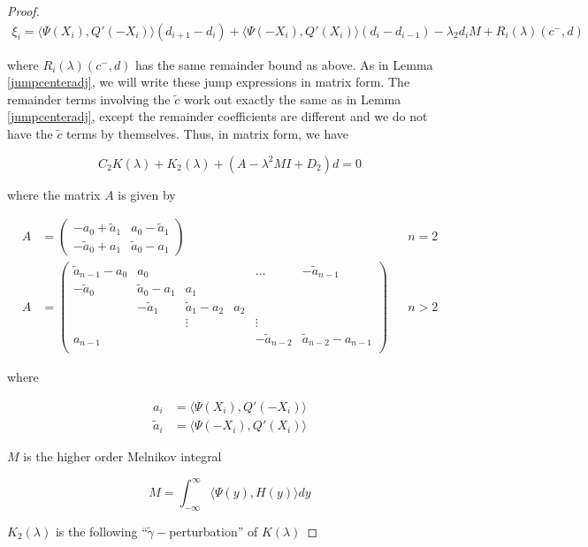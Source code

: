 \documentclass[thesis.tex]{subfiles}
\begin{document}
\begin{lemma}
\begin{proof}
\begin{align*}
\xi_i = \langle \Psi(X_i), Q'(-X_i) \rangle (d_{i+1} - d_i)
+ \langle \Psi(-X_i), Q'(X_i) \rangle (d_i - d_{i-1})
- \lambda_2 d_i M + R_i(\lambda)(c^-, d)
\end{align*}

where $R_i(\lambda)(c^-, d)$ has the same remainder bound as above. As in Lemma \ref{jumpcenteradj}, we will write these jump expressions in matrix form. The remainder terms involving the $\tilde{c}$ work out exactly the same as in Lemma \ref{jumpcenteradj}, except the remainder coefficients are different and we do not have the $\tilde{c}$ terms by themselves. Thus, in matrix form, we have

\[
C_2 K(\lambda) + K_2(\lambda) + (A - \lambda^2 M I + D_2)d = 0
\]

where the matrix $A$ is given by

\begin{align*}
A &= \begin{pmatrix}
-a_0 + \tilde{a}_1 & a_0 - \tilde{a}_1 \\
-\tilde{a}_0 + a_1 & \tilde{a}_0 - a_1
\end{pmatrix} && n = 2 \\
A &= \begin{pmatrix}
\tilde{a}_{n-1} - a_0 & a_0 & & & \dots & -\tilde{a}_{n-1}\\
-\tilde{a}_0 & \tilde{a}_0 - a_1 &  a_1 \\
& -\tilde{a}_1 & \tilde{a}_1 - a_2 &  a_2 \\
& & \vdots & & \vdots \\
a_{n-1} & & & & -\tilde{a}_{n-2} & \tilde{a}_{n-2} - a_{n-1} \\
\end{pmatrix} && n > 2
\end{align*}

where

\begin{align*}
a_i &= \langle \Psi(X_i), Q'(-X_i) \rangle \\
\tilde{a}_i &= \langle \Psi(-X_i), Q'(X_i) \rangle
\end{align*}

$M$ is the higher order Melnikov integral

\[
M = \int_{-\infty}^\infty \langle \Psi(y), H(y) \rangle dy
\]

$K_2(\lambda)$ is the following ``$\tilde{\gamma}-$perturbation'' of $K(\lambda)$ 


\end{proof}
\end{lemma}
\end{document}
